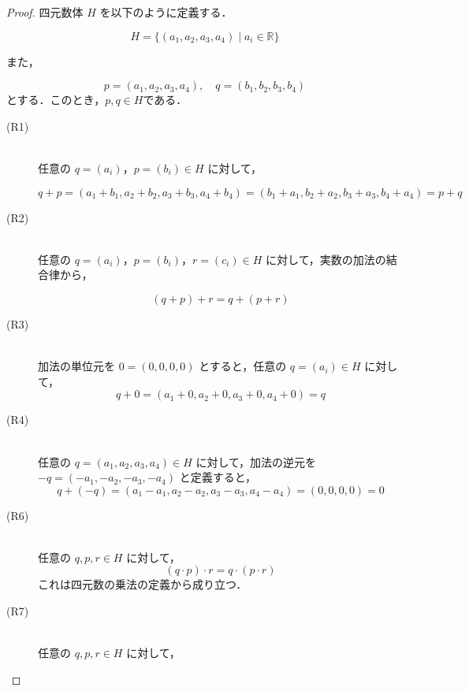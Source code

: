 \begin{leftbar}
    \begin{proof}
        四元数体 $H$ を以下のように定義する．

        \[
            H = \{ (a_1, a_2, a_3, a_4) \mid a_i \in \mathbb{R}\}
        \]

        また，

        \[
            p=(a_1, a_2, a_3, a_4),\quad q=(b_1, b_2, b_3, b_4)
        \]
        とする．このとき，$ p ,q \in H$である．
        \begin{description}
            \item [(R1)] \mbox{} \\
                  任意の $q = (a_i)$，$p = (b_i) \in H$ に対して，

                  \[
                      q + p = (a_1 + b_1, a_2 + b_2, a_3 + b_3, a_4 + b_4) = (b_1 + a_1, b_2 + a_2, b_3 + a_3, b_4 + a_4) = p + q
                  \]
            \item [(R2)] \mbox{} \\
                  任意の $q = (a_i)$，$p = (b_i)$，$r = (c_i) \in H$ に対して，実数の加法の結合律から，

                  \[
                      (q + p) + r = q + (p + r)
                  \]
            \item [(R3)] \mbox{} \\
                  加法の単位元を $0 = (0, 0, 0, 0)$ とすると，任意の $q = (a_i) \in H$ に対して，
                  \[
                      q + 0 = (a_1 + 0, a_2 + 0, a_3 + 0, a_4 + 0) = q
                  \]

            \item [(R4)] \mbox{} \\
                  任意の $q = (a_1, a_2, a_3, a_4) \in H$ に対して，加法の逆元を $-q = (-a_1, -a_2, -a_3, -a_4)$ と定義すると，
                  \[
                      q + (-q) = (a_1 - a_1, a_2 - a_2, a_3 - a_3, a_4 - a_4) = (0, 0, 0, 0) = 0
                  \]
            \item [(R6)] \mbox{} \\
                  任意の $q, p, r \in H$ に対して，
                  \[
                      (q \cdot p) \cdot r = q \cdot (p \cdot r)
                  \]
                  これは四元数の乗法の定義から成り立つ．
            \item[(R7)] \mbox{} \\
                  任意の $q, p, r \in H$ に対して，


\end{description}
\end{proof}
\end{leftbar}
